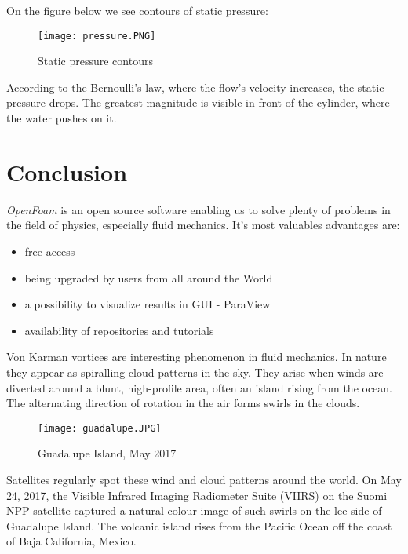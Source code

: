 \documentclass[a4paper,11pt]{article}
\begin{document}
\newpage

On the figure below we see contours of static pressure:

\begin{figure}[h]
  \centering
  \texttt{[image: pressure.PNG]}
  \caption{Static pressure contours}
\end{figure}

According to the Bernoulli’s law, where the flow's velocity increases, the static pressure drops. The greatest magnitude is visible in front of the cylinder, where the water pushes on it.

\section{Conclusion}

\emph{OpenFoam} is an open source software enabling us to solve plenty of problems in the field of physics, especially fluid mechanics. It's most valuables advantages are:

\begin{itemize}
  \item free access
  \item being upgraded by users from all around the World
  \item a possibility to visualize results in GUI - ParaView
  \item availability of repositories and tutorials
\end{itemize}

Von Karman vortices are interesting phenomenon in fluid mechanics. In nature they appear as spiralling cloud patterns in the sky. They arise when winds are diverted around a blunt, high-profile area, often an island rising from the ocean. The alternating direction of rotation in the air forms swirls in the clouds.

\begin{figure}[h]
  \centering
  \texttt{[image: guadalupe.JPG]}
  \caption{Guadalupe Island, May 2017}
\end{figure}

\newpage

Satellites regularly spot these wind and cloud patterns around the world. On May 24, 2017, the Visible Infrared Imaging Radiometer Suite (VIIRS) on the Suomi NPP satellite captured a natural-colour image of such swirls on the lee side of Guadalupe Island. The volcanic island rises from the Pacific Ocean off the coast of Baja California, Mexico.
\end{document}
